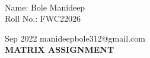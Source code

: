 \documentclass[10pt,a4paper]{report}
\begin{document}
 \vspace{3mm}\\ \raggedleft Name: Bole Manideep\vspace{2mm}\\ \raggedleft Roll No.: FWC22026\vspace{2mm}\\ \raggedright Sep 2022 \hspace{12cm} \raggedleft manideepbole312@gmail.com \vspace{10mm}
\\ \centering \Large \textbf{MATRIX ASSIGNMENT} \normalsize \vspace{15mm}
\end{document}
